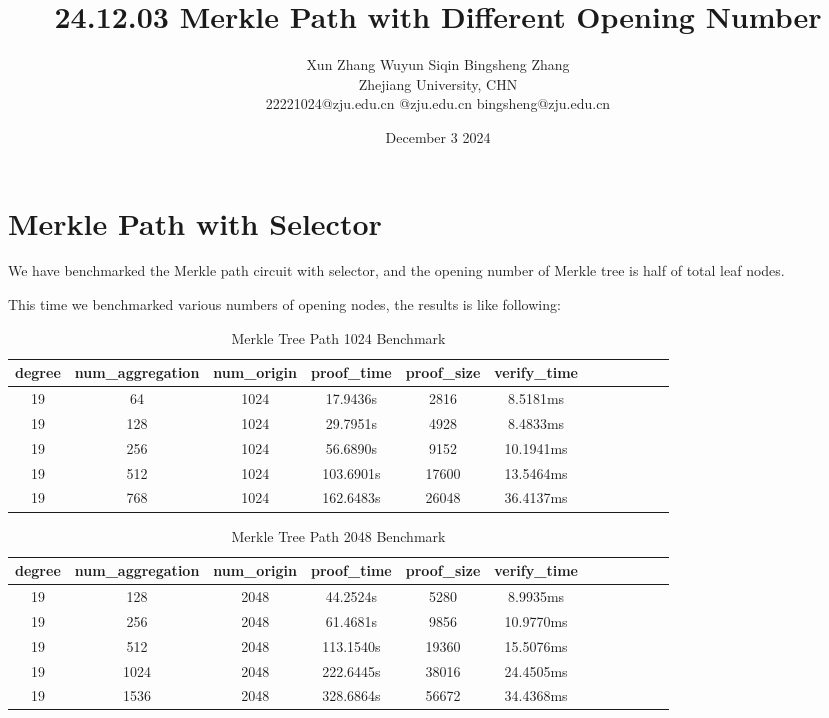 \documentclass{article}
\title{24.12.03 Merkle Path with Different Opening Number}
\author{Xun Zhang \quad \quad Wuyun Siqin \quad \quad Bingsheng Zhang \\ 
Zhejiang University, CHN \\
22221024@zju.edu.cn \quad 3210101763@zju.edu.cn \quad bingsheng@zju.edu.cn}
\date{December 3 2024}
\begin{document}
\maketitle

\section{Merkle Path with Selector}

We have benchmarked the Merkle path circuit with selector, and the opening number of Merkle tree is half of total leaf nodes.

This time we benchmarked various numbers of opening nodes, the results is like following:

\begin{table}[h!]
\centering
\begin{tabular}{|c|c|c|c|c|c|c|c|c|c|c|c|}
\hline
\textbf{degree}    & \textbf{num\_aggregation} & \textbf{num\_origin} & \textbf{proof\_time} & \textbf{proof\_size} & \textbf{verify\_time} \\ \hline

19    & 64 & 1024 & 17.9436s &2816& 8.5181ms \\ \hline
19   & 128 & 1024 & 29.7951s &4928&8.4833ms \\ \hline
19   & 256 & 1024 & 56.6890s &9152&10.1941ms \\ \hline
19   & 512 & 1024 & 103.6901s&17600&13.5464ms \\ \hline
19   & 768 & 1024 & 162.6483s&26048&36.4137ms
 \\ \hline
\end{tabular}
\caption{Merkle Tree Path 1024 Benchmark}
\label{tab:data_table}
\end{table}


\begin{table}[h!]
\centering
\begin{tabular}{|c|c|c|c|c|c|c|c|c|c|c|c|}
\hline
\textbf{degree}    & \textbf{num\_aggregation} & \textbf{num\_origin} & \textbf{proof\_time} & \textbf{proof\_size} & \textbf{verify\_time} \\ \hline


19   & 128 & 2048 & 44.2524s&5280&8.9935ms \\ \hline
19   & 256 & 2048 & 61.4681s&9856&10.9770ms \\ \hline
19   & 512 & 2048 & 113.1540s&19360&15.5076ms \\ \hline
19   & 1024 & 2048 & 222.6445s&38016&24.4505ms \\ \hline
19   & 1536 & 2048 & 328.6864s&56672&34.4368ms \\ \hline
\end{tabular}
\caption{Merkle Tree Path 2048 Benchmark}
\label{tab:data_table}
\end{table}
\end{document}
